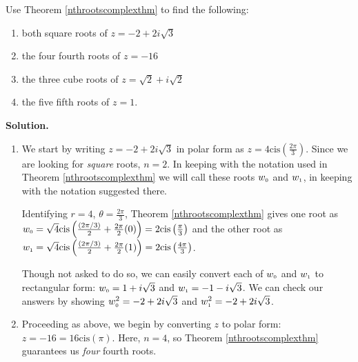 \documentclass{ximera}
\begin{document}
\begin{example} \label{nthrootscomplexex}  Use Theorem \ref{nthrootscomplexthm} to find the following:

\begin{enumerate}

\item  both square roots of $z = -2  + 2i\sqrt{3}$

\item  \label{fourthrootsneg16} the four fourth roots of $z = -16$

\item  \label{halfanglecuberoot} the three cube roots of $z = \sqrt{2} + i \sqrt{2}$

\item  \label{calculatorfifthroot} the five fifth roots of $z = 1$.

\end{enumerate}

{\bf Solution.}

\begin{enumerate}

\item  We start by writing $z= - 2 + 2i\sqrt{3}$ in polar form as $z = 4 \text{cis}\left(\frac{2\pi}{3}\right)$. Since we are looking for \textit{square} roots, $n=2$.  In keeping with the notation used in Theorem \ref{nthrootscomplexthm}  we will call these roots  $w_{\text{\tiny$0$}}$ and $w_{\text{\tiny$1$}}$, in keeping with the notation suggested there.  

\smallskip

 Identifying $r =4$,  $\theta = \frac{2\pi}{3}$, Theorem \ref{nthrootscomplexthm} gives  one root as $w_{\text{\tiny$0$}} = \sqrt{4} \text{cis}\left(\frac{(2\pi/3)}{2} + \frac{2\pi}{2} (0)\right) = 2\text{cis}\left(\frac{\pi}{3}\right)$ and the other root as $w_{\text{\tiny$1$}} = \sqrt{4} \text{cis}\left(\frac{(2\pi/3)}{2} + \frac{2\pi}{2} (1)\right) = 2\text{cis}\left(\frac{4\pi}{3}\right)$.   
 
 \smallskip
 
 Though not asked to do so, we can easily convert each of $w_{\text{\tiny$0$}}$ and $w_{\text{\tiny$1$}}$ to  rectangular form:  $w_{\text{\tiny$0$}}  =  1+i\sqrt{3}$ and $w_{\text{\tiny$1$}}  = -1-i\sqrt{3}$.  We can check our answers by showing $w_{\text{\tiny$0$}}^2= -2 + 2i\sqrt{3}$ and $w_{\text{\tiny$1$}}^2= -2 + 2i\sqrt{3}$.

\item  Proceeding as above, we begin by converting $z$ to polar form: $z = -16 = 16 \text{cis}(\pi)$.  Here, $n = 4$, so Theorem \ref{nthrootscomplexthm} guarantees  us \textit{four} fourth roots.


\end{enumerate}
\end{example}
\end{document}
